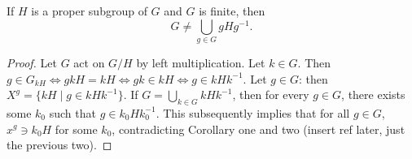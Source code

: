 \begin{cor}
    If $H$ is a proper subgroup of $G$ and $G$ is finite, then \[
    G\neq  \bigcup_{g\in G} gHg^{-1}.
    \] 
\end{cor}
\begin{proof}
    Let $G$ act on $G /H$ by left multiplication. Let $k\in G$. Then $g\in G_{kH}\iff gkH=kH \iff gk\in kH\iff g\in kHk^{-1}$. Let $g\in G$: then $X^g=\{ kH \mid g\in kHk^{-1}\} $. If $G=\bigcup_{k\in G} kHk^{-1}$, then for every $g\in G$, there exists some $k_0$ such that $g\in k_0Hk_0^{-1}$. This subsequently implies that for all $g\in G$, $x^g \ni k_0H$ for some $k_0$, contradicting Corollary one and two (insert ref later, just the previous two).
\end{proof}



